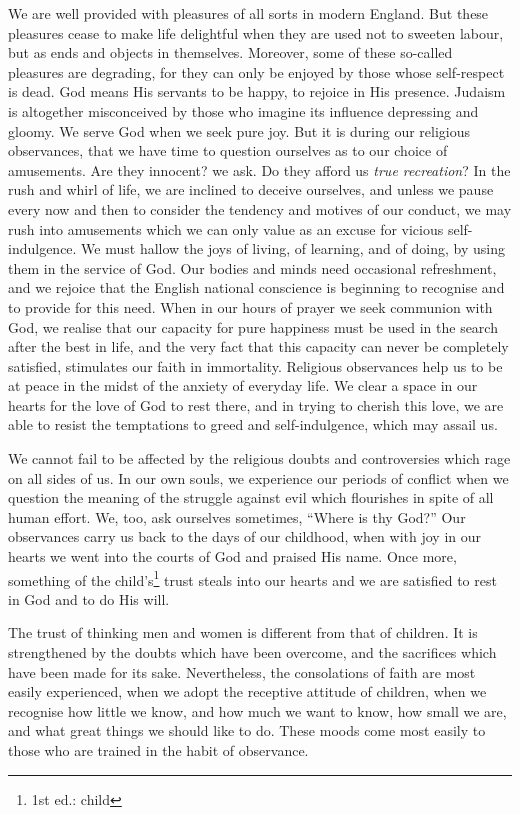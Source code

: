 We are well provided with pleasures of all
sorts in modern England. But these pleasures
cease to make life delightful when they are
used not to sweeten labour, but as ends and
objects in themselves. Moreover, some of
these so-called pleasures are degrading, for
they can only be enjoyed by those whose
self-respect is dead. God means His servants
to be happy, to rejoice in His presence.
Judaism is altogether misconceived by those
who imagine its influence depressing and
gloomy. We serve God when we seek
pure joy. But it is during our religious
observances, that we have time to question
ourselves as to our choice of amusements.
Are they innocent? we ask. Do they afford
us \textsl{true recreation}? In the rush and whirl
of life, we are inclined to deceive ourselves,
and unless we pause every now and then
to consider the tendency and motives of
our conduct, we may rush into amusements
which we can only value as an excuse for
vicious self-indulgence. We must hallow
the joys of living, of learning, and of doing,
by using them in the service of God. Our
bodies and minds need occasional refreshment,
and we rejoice that the English
national conscience is beginning to recognise
and to provide for this need. When in our
hours of prayer we seek communion with
God, we realise that our capacity for pure
happiness must be used in the search after
the best in life, and the very fact that this
capacity can never be completely satisfied,
stimulates our faith in immortality.
Religious observances help us to be at
peace in the midst of the anxiety of everyday
life. We clear a space in our hearts for
the love of God to rest there, and in trying
to cherish this love, we are able to resist the
temptations to greed and self-indulgence,
which may assail us.

We cannot fail to be affected by the religious
doubts and controversies which rage
on all sides of us. In our own souls, we
experience our periods of conflict when we
question the meaning of the struggle against
evil which flourishes in spite of all human
effort. We, too, ask ourselves sometimes,
“Where is thy God?” Our observances
carry us back to the days of our childhood,
when with joy in our hearts we went
into the courts of God and praised His
name. Once more, something of the child's\footnote{1st ed.: child}
trust steals into our hearts and we are
satisfied to rest in God and to do His
will.

The trust of thinking men and women
is different from that of children. It is
strengthened by the doubts which have
been overcome, and the sacrifices which have
been made for its sake. Nevertheless, the
consolations of faith are most easily experienced,
when we adopt the receptive
attitude of children, when we recognise how
little we know, and how much we want to
know, how small we are, and what great
things we should like to do. These moods
come most easily to those who are trained in
the habit of observance.

